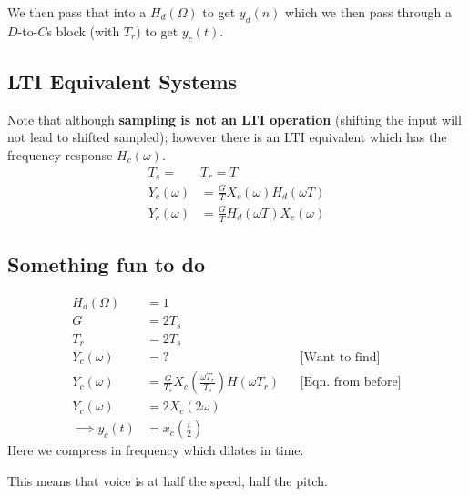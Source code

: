 We then pass that into a $H_d(\Omega)$ to get $y_d(n)$ which we then pass through a $D$-to-$C$s block (with $T_r$) to get $y_c(t)$.


\hrulefill

\subsection{LTI Equivalent Systems}
Note that although \textbf{sampling is not an LTI operation} (shifting the input will not lead to shifted sampled); however there is an LTI equivalent which has the frequency response $H_c(\omega)$.
\begin{align*}
    T_s = 
    &T_r = T
    \\
    Y_c(\omega) 
    &= \frac{G}{T} X_c(\omega) H_d(\omega T) 
    \\
    Y_c(\omega) 
    &= \frac{G}{T} H_d(\omega T) X_c(\omega)
\end{align*}

\subsection{Something fun to do}

\begin{align*}
    H_d(\Omega)
    &=1
    \\
    G
    &= 2T_s
    \\
    T_r
    &= 2T_s
    \\
    Y_c(\omega) 
    &= ?
    &&\text{[Want to find]}
    \\
    Y_c(\omega) 
    &=
    \frac G{T_s}X_c\left(\frac{\omega T_r}{T_s}\right) H\left({\omega T_r}\right)
    &&\text{[Eqn. from before]}
    \\
    Y_c(\omega) 
    &=
    2X_c(2\omega)
    \\
    \implies
    y_c(t) 
    &= 
    x_c(\frac t2)
\end{align*}
Here we compress in frequency which dilates in time.

This means that voice is at half the speed, half the pitch.
